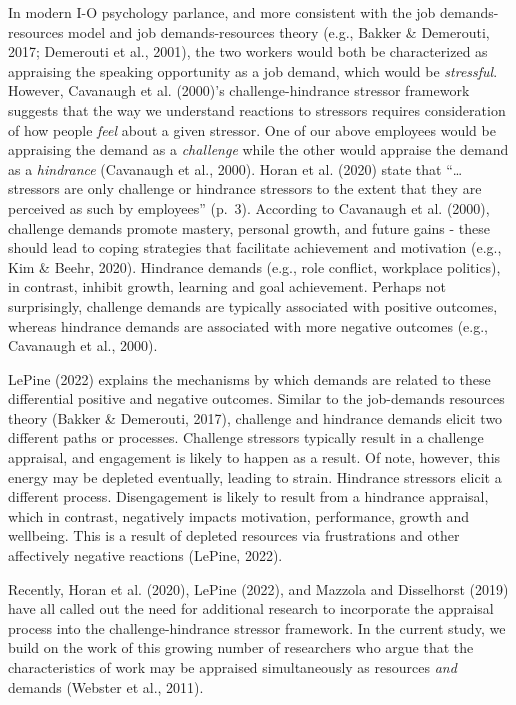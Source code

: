 \documentclass[
  man]{apa6}
\begin{document}
In modern I-O psychology parlance, and more consistent with the job demands-resources model and job demands-resources theory (e.g., Bakker \& Demerouti, 2017; Demerouti et al., 2001), the two workers would both be characterized as appraising the speaking opportunity as a job demand, which would be \emph{stressful}. However, Cavanaugh et al. (2000)'s challenge-hindrance stressor framework suggests that the way we understand reactions to stressors requires consideration of how people \emph{feel} about a given stressor. One of our above employees would be appraising the demand as a \emph{challenge} while the other would appraise the demand as a \emph{hindrance} (Cavanaugh et al., 2000). Horan et al. (2020) state that ``\ldots stressors are only challenge or hindrance stressors to the extent that they are perceived as such by employees'' (p.~3). According to Cavanaugh et al. (2000), challenge demands promote mastery, personal growth, and future gains - these should lead to coping strategies that facilitate achievement and motivation (e.g., Kim \& Beehr, 2020). Hindrance demands (e.g., role conflict, workplace politics), in contrast, inhibit growth, learning and goal achievement. Perhaps not surprisingly, challenge demands are typically associated with positive outcomes, whereas hindrance demands are associated with more negative outcomes (e.g., Cavanaugh et al., 2000).

LePine (2022) explains the mechanisms by which demands are related to these differential positive and negative outcomes. Similar to the job-demands resources theory (Bakker \& Demerouti, 2017), challenge and hindrance demands elicit two different paths or processes. Challenge stressors typically result in a challenge appraisal, and engagement is likely to happen as a result. Of note, however, this energy may be depleted eventually, leading to strain. Hindrance stressors elicit a different process. Disengagement is likely to result from a hindrance appraisal, which in contrast, negatively impacts motivation, performance, growth and wellbeing. This is a result of depleted resources via frustrations and other affectively negative reactions (LePine, 2022).

Recently, Horan et al. (2020), LePine (2022), and Mazzola and Disselhorst (2019) have all called out the need for additional research to incorporate the appraisal process into the challenge-hindrance stressor framework. In the current study, we build on the work of this growing number of researchers who argue that the characteristics of work may be appraised simultaneously as resources \emph{and} demands (Webster et al., 2011).
\end{document}
